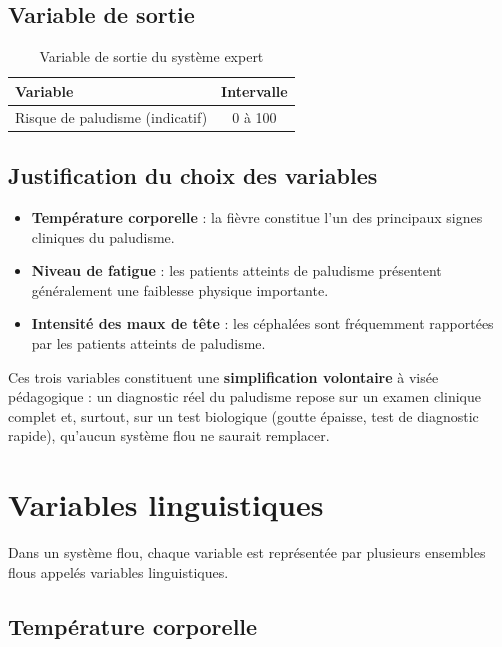 \documentclass[a4paper,12pt]{report} %
\begin{document}
\subsection{Variable de sortie}

\begin{table}[H]
\centering
\caption{Variable de sortie du système expert}
\begin{tabular}{|l|c|}
\hline
\textbf{Variable} & \textbf{Intervalle} \\
\hline
Risque de paludisme (indicatif) & 0 à 100 \\
\hline
\end{tabular}
\end{table}

\subsection{Justification du choix des variables}

\begin{itemize}
\item \textbf{Température corporelle} : la fièvre constitue l'un des principaux signes cliniques du paludisme.
\item \textbf{Niveau de fatigue} : les patients atteints de paludisme présentent généralement une faiblesse physique importante.
\item \textbf{Intensité des maux de tête} : les céphalées sont fréquemment rapportées par les patients atteints de paludisme.
\end{itemize}

Ces trois variables constituent une \textbf{simplification volontaire} à visée pédagogique : un diagnostic réel du paludisme repose sur un examen clinique complet et, surtout, sur un test biologique (goutte épaisse, test de diagnostic rapide), qu'aucun système flou ne saurait remplacer.

\section{Variables linguistiques}

Dans un système flou, chaque variable est représentée par plusieurs ensembles flous appelés variables linguistiques.

\subsection{Température corporelle}
\end{document}
